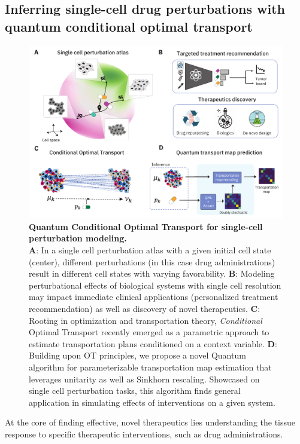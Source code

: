 \documentclass{article}
\begin{document}
\subsection{Inferring single-cell drug perturbations with quantum conditional optimal transport}

\begin{figure}[ht]
    \centering
\includegraphics[width=.95\columnwidth, keepaspectratio]{figures/ws3_overview.pdf}
    \caption{\textbf{Quantum Conditional Optimal Transport for single-cell perturbation modeling.}\\
    \textbf{A}: In a single cell perturbation atlas with a given initial cell state (center), different perturbations (in this case drug administrations) result in different cell states with varying favorability.
    \textbf{B}: Modeling perturbational effects of biological systems with single cell resolution may impact immediate clinical applications (personalized treatment recommendation) as well as discovery of novel therapeutics.
    \textbf{C}: Rooting in optimization and transportation theory, \textit{Conditional} Optimal Transport recently emerged as a parametric approach to estimate transportation plans conditioned on a context variable.
    \textbf{D}: Building upon OT principles, we propose a novel Quantum algorithm for parameterizable transportation map estimation that leverages unitarity as well as Sinkhorn rescaling.
    Showcased on single cell perturbation tasks, this algorithm finds general application in simulating effects of interventions on a given system.
    }
    \label{fig:qondot}
\end{figure}
At the core of finding effective, novel therapeutics lies understanding the tissue response to specific therapeutic interventions, such as drug administrations.  
\end{document}
